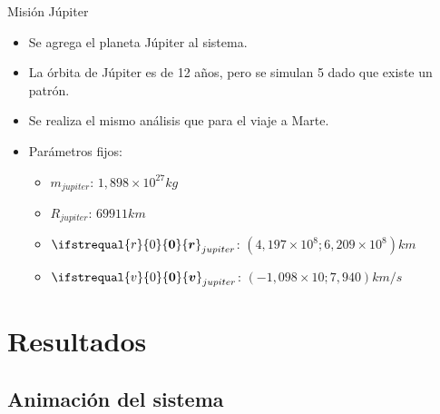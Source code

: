 \documentclass{beamer}
\renewcommand\vec[1]{\ifstrequal{#1}{0}{\ensuremath{\mathbf{0}}}{\ensuremath{\boldsymbol{#1}}}}
\begin{document}
            \begin{frame}{Misión Júpiter}
                \begin{itemize}
                    \item Se agrega el planeta Júpiter al sistema.
                    \item La órbita de Júpiter es de 12 años, pero se simulan 5 dado que existe un patrón.
                    \item Se realiza el mismo análisis que para el viaje a Marte.
                    \item Parámetros fijos:
                    \begin{itemize}
                        \item $m_{jupiter}$: \alert{$1,898\times 10^{27}kg$}
                        \item $R_{jupiter}$: \alert{$69911km$}
                        \item $\vec{r}_{jupiter}$: \alert{$(4,197\times 10^{8}; 6,209\times 10^{8})km$}
                        \item $\vec{v}_{jupiter}$: \alert{$(-1,098\times 10; 7,940)km/s$}
                    \end{itemize}
                \end{itemize}
            \end{frame}

    \section{Resultados}

        \subsection{Animación del sistema}
\end{document}
